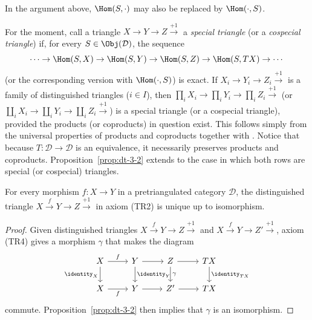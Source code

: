 In the argument above, $\Hom(S, \cdot)$ may also be replaced by
$\Hom(\cdot, S)$.

\begin{remark}\label{rem:special-triangles}
	For the moment, call a triangle $X \to Y \to Z \xrightarrow{+1}$ a
	\emph{special triangle} (or a \emph{cospecial triangle}) if, for every
	$S \in \Obj(\mathcal{D})$, the sequence
	\[ \cdots \to \Hom(S, X) \to \Hom(S, Y) \to \Hom(S, Z) \to \Hom(S, TX) \to \cdots \]
	(or the corresponding version with $\Hom(\cdot, S)$) is exact. If
	$X_i \to Y_i \to Z_i \xrightarrow{+1}$ is a family of distinguished
	triangles ($i \in I$), then
	$\prod_i X_i \to \prod_i Y_i \to \prod_i Z_i \xrightarrow{+1}$ (or
	$\coprod_i X_i \to \coprod_i Y_i \to \coprod_i Z_i \xrightarrow{+1}$)
	is a special triangle (or a cospecial triangle), provided the products
	(or coproducts) in question exist. This follows simply from the universal
	properties of products and coproducts together with
	\cite[Lemma~6.8.3]{Li1}. Notice that because
	$T: \mathcal{D} \to \mathcal{D}$ is an equivalence, it necessarily
	preserves products and coproducts. Proposition~\ref{prop:dt-3-2} extends
	to the case in which both rows are special (or cospecial) triangles.
\end{remark}

\begin{corollary}\label{prop:Cone-uniqueness}
	For every morphism $f: X \to Y$ in a pretriangulated category
	$\mathcal{D}$, the distinguished triangle
	$X \xrightarrow{f} Y \to Z \xrightarrow{+1}$ in axiom (TR2) is unique
	up to isomorphism.
\end{corollary}

\begin{proof}
	Given distinguished triangles
	$X \xrightarrow{f} Y \to Z \xrightarrow{+1}$ and
	$X \xrightarrow{f} Y \to Z' \xrightarrow{+1}$, axiom (TR4) gives a
	morphism $\gamma$ that makes the diagram
	\[\begin{tikzcd}
		X \arrow[r, "f"] \arrow[d, "\identity_X"'] & Y \arrow[r] \arrow[d, "\identity_Y"] & Z \arrow[r] \arrow[d, "\gamma"] & TX \arrow[d, "\identity_{TX}"] \\
		X \arrow[r, "f"'] & Y \arrow[r] & Z' \arrow[r] & T X
	\end{tikzcd}\]
	commute. Proposition~\ref{prop:dt-3-2} then implies that $\gamma$ is an
	isomorphism.
\end{proof}

